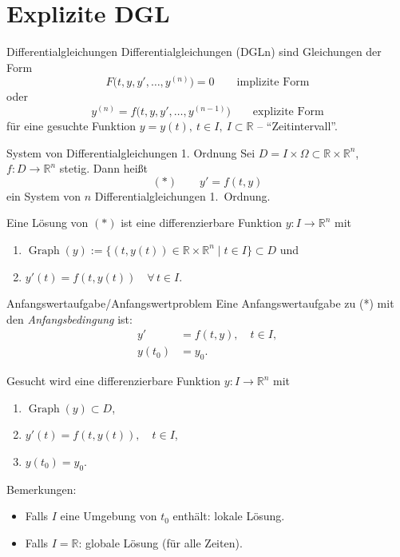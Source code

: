\newpage
\section{Explizite DGL}
\label{5.1}

\begin{definition}{Differentialgleichungen}
    Differentialgleichungen (DGLn) sind Gleichungen der Form
    $$
    F\bigl(t,y,y',\dots,y^{(n)}\bigr)=0 \qquad \text{implizite Form}
    $$
    oder
    $$
    y^{(n)} = f\bigl(t,y,y',\dots,y^{(n-1)}\bigr) \qquad \text{explizite Form}
    $$
    für eine gesuchte Funktion $y=y(t),\ t\in I,\ I\subset\mathbb{R}$ -- ``Zeitintervall''.      
\end{definition}

\begin{definition}{System von Differentialgleichungen 1. Ordnung}
    Sei $D = I \times \Omega \subset \mathbb{R} \times \mathbb{R}^n$, $f\colon D \to \mathbb{R}^n$ stetig. Dann heißt
    $$
    (*)\qquad y' = f(t,y)
    $$
    ein System von $n$ Differentialgleichungen 1.\ Ordnung.
    \vspace{1em}

    Eine Lösung von $(*)$ ist eine differenzierbare Funktion $y\colon I \to \mathbb{R}^n$ mit
    \begin{enumerate}%
    \item $\operatorname{Graph}(y):=\{(t,y(t))\in\mathbb{R}\times\mathbb{R}^n \mid t\in I\}\subset D$ und
    \item $y'(t)=f(t,y(t))\quad\forall\,t\in I$.
    \end{enumerate}   
\end{definition}

\begin{definition}{Anfangswertaufgabe/Anfangswertproblem}
    Eine Anfangswertaufgabe zu (*) mit den \emph{Anfangsbedingung} ist:
    $$
        \begin{aligned}
            y' &= f(t,y),\quad t\in I,\\
            y(t_0) &= y_0.
        \end{aligned}
    $$

    Gesucht wird eine differenzierbare Funktion $y\colon I\to\mathbb{R}^n$ mit
    \begin{enumerate}%
        \item $\operatorname{Graph}(y)\subset D$,
        \item $y'(t)=f(t,y(t)),\quad t\in I$,
        \item $y(t_0)=y_0$.
    \end{enumerate}

    Bemerkungen:
    \begin{itemize}
        \item Falls $I$ eine Umgebung von $t_0$ enthält: lokale Lösung.
        \item Falls $I=\mathbb{R}$: globale Lösung (für alle Zeiten).
    \end{itemize}
\end{definition}

